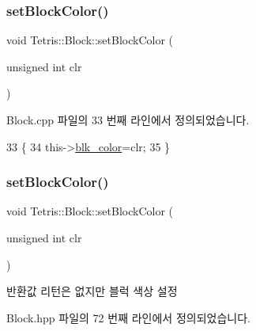 \subsubsection{\texorpdfstring{set\+Block\+Color()}{setBlockColor()}\hspace{0.1cm}{\footnotesize\ttfamily [1/2]}}
{\footnotesize\ttfamily void Tetris\+::\+Block\+::set\+Block\+Color (\begin{DoxyParamCaption}\item[{unsigned int}]{clr }\end{DoxyParamCaption})}



Block.\+cpp 파일의 33 번째 라인에서 정의되었습니다.


\begin{DoxyCode}
33                                          \{
34                 this->\hyperlink{class_tetris_1_1_block_acf78e864526e38c9c72fa0b012d5b344}{blk\_color}=clr;
35             \}
\end{DoxyCode}
\mbox{\label{class_tetris_1_1_block_a1a3fab9e7eabe64a4ba588ed5091d3a9}} 
\subsubsection{\texorpdfstring{set\+Block\+Color()}{setBlockColor()}\hspace{0.1cm}{\footnotesize\ttfamily [2/2]}}
{\footnotesize\ttfamily void Tetris\+::\+Block\+::set\+Block\+Color (\begin{DoxyParamCaption}\item[{unsigned int}]{clr }\end{DoxyParamCaption})\hspace{0.3cm}{\ttfamily [inline]}}

\begin{DoxyReturn}{반환값}
리턴은 없지만 블럭 색상 설정 
\end{DoxyReturn}


Block.\+hpp 파일의 72 번째 라인에서 정의되었습니다.


